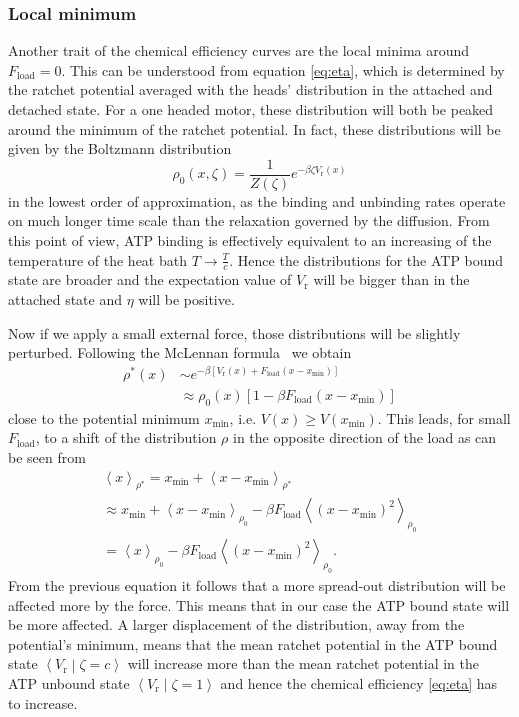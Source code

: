 \documentclass[aps,pre,twocolumn,showpacs,showkeys,superscriptaddress,floatfix]{revtex4-1}
\begin{document}
\subsubsection{Local minimum}
Another trait of the chemical efficiency curves are the local minima around $F_\text{load}=0$. 
This can be understood from equation \eqref{eq:eta}, which is determined by the ratchet potential averaged with the heads' distribution in the attached and detached state. 
For a one headed motor, these distribution will both be peaked around the minimum of the ratchet potential. 
In fact, these distributions will be given by the Boltzmann distribution
\begin{equation}
\rho_0(x,\zeta) = \frac{1}{Z(\zeta)} e^{-\beta \zeta V_\text{r}(x)}
\end{equation} 
in the lowest order of approximation, as the binding and unbinding rates operate on much longer time scale than the relaxation governed by the diffusion. 
From this point of view, ATP binding is effectively equivalent to an increasing of the temperature of the heat bath $T\rightarrow\frac{T}{c}$. 
Hence the distributions for the ATP bound state are broader and the expectation value of $V_\text{r}$ will be bigger than in the attached state and $\eta$ will be positive. 

Now if we apply a small external force, those distributions will be slightly perturbed. 
Following the McLennan formula~\cite{Maes2010} we obtain  
\begin{align*}
\rho^*(x) 
&\sim e^{-\beta \left[V_\text{r}(x) + F_\text{load} \left( x - x_\text{min} \right) \right]} \\
&\approx \rho_0(x) \left[1 - \beta F_\text{load} \left( x - x_\text{min} \right) \right]
\end{align*}
close to the potential minimum $x_\text{min}$, i.e. $V(x) \ge V(x_\text{min})$. 
This leads, for small $F_\text{load}$, to a shift of the distribution $\rho$ in the opposite direction of the load
as can be seen from 
\begin{multline}
\left\langle x \right\rangle_{\rho^*} 
= x_\text{min} + \left\langle x - x_\text{min} \right\rangle_{\rho^*}
\\
\approx x_\text{min} + \left\langle x - x_\text{min} \right\rangle_{\rho_0} 
- \beta F_\text{load} \left\langle \left( x - x_\text{min} \right)^2 \right\rangle_{\rho_0} 
\\
= \left\langle x \right\rangle_{\rho_0}
- \beta F_\text{load} \left\langle \left( x - x_\text{min} \right)^2 \right\rangle_{\rho_0} .
\label{eq:mean_position_shift}
\end{multline}
From the previous equation it follows that a more spread-out distribution will be affected more by the force.
This means that in our case the ATP bound state will be more affected.
A larger displacement of the distribution, away from the potential's minimum, 
means that the mean ratchet potential in the ATP bound state $\left\langle V_\text{r} \middle| \zeta = c \right\rangle$ will increase more than the mean ratchet potential in the ATP unbound state $\left\langle V_\text{r} \middle| \zeta = 1 \right\rangle$ and hence the chemical efficiency \eqref{eq:eta} has to increase. 
\end{document}
